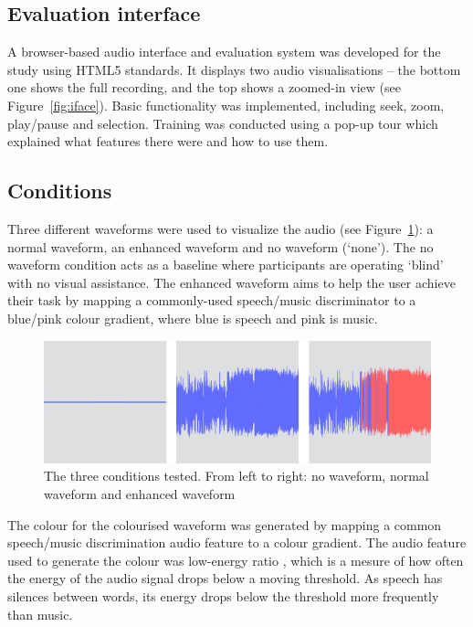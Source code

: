 \subsection{Evaluation interface}
A browser-based audio interface and evaluation system was developed for the study using HTML5 standards. It displays
two audio visualisations -- the bottom one shows the full recording, and the top shows a zoomed-in view (see
Figure~\ref{fig:iface}).  Basic functionality was implemented, including seek, zoom, play/pause and selection. Training
was conducted using a pop-up tour which explained what features there were and how to use them.

\subsection{Conditions}
Three different waveforms were used to visualize the audio (see Figure~\ref{fig:conditions}): a normal waveform, an
enhanced waveform and no waveform (`none'). The no waveform condition acts as a baseline where participants are
operating `blind' with no visual assistance. The enhanced waveform aims to help the user achieve their task by mapping
a commonly-used speech/music discriminator to a blue/pink colour gradient, where blue is speech and pink is music.

\begin{figure}[!h]
\centering
\includegraphics[width=\columnwidth]{figs/conditions-horz.png}
\caption{The three conditions tested. From left to right: no waveform, normal
  waveform and enhanced waveform}
\label{fig:conditions}
\end{figure}

The colour for the colourised waveform was generated by mapping a common speech/music discrimination audio feature to a
colour gradient. The audio feature used to generate the colour was low-energy ratio \citep{Panagiotakis2005}, which is
a mesure of how often the energy of the audio signal drops below a moving threshold. As speech has silences between
words, its energy drops below the threshold more frequently than music.

